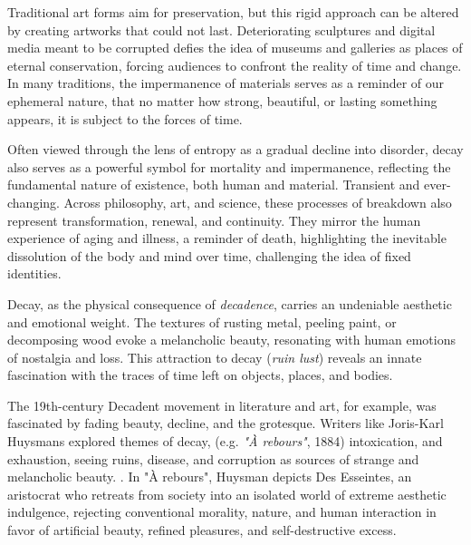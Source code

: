 Traditional art forms aim for preservation, but this rigid approach can be altered by creating artworks that could not last. Deteriorating sculptures and digital media meant to be corrupted defies the idea of museums and galleries as places of eternal conservation, forcing audiences to confront the reality of time and change. In many traditions, the impermanence of materials serves as a reminder of our ephemeral nature, that no matter how strong, beautiful, or lasting something appears, it is subject to the forces of time.

Often viewed through the lens of entropy as a gradual decline into disorder, decay also serves as a powerful symbol for mortality and impermanence, reflecting the fundamental nature of existence, both human and material. Transient and ever-changing. Across philosophy, art, and science, these processes of breakdown also represent transformation, renewal, and continuity. They mirror the human experience of aging and illness, a reminder of death, highlighting the inevitable dissolution of the body and mind over time, challenging the idea of fixed identities. 






Decay, as the physical consequence of \textit{decadence}, carries an undeniable aesthetic and emotional weight. The textures of rusting metal, peeling paint, or decomposing wood evoke a melancholic beauty, resonating with human emotions of nostalgia and loss. This attraction to decay (\textit{ruin lust}) reveals an innate fascination with the traces of time left on objects, places, and bodies.

The 19th-century Decadent movement in literature and art, for example, was fascinated by fading beauty, decline, and the grotesque. Writers like Joris-Karl Huysmans explored themes of decay, (e.g. \textit{"À rebours"}, 1884) intoxication, and exhaustion, seeing ruins, disease, and corruption as sources of strange and melancholic beauty. \citep{huysmans1884}. In "À rebours", Huysman depicts Des Esseintes, an aristocrat who retreats from society into an isolated world of extreme aesthetic indulgence, rejecting conventional morality, nature, and human interaction in favor of artificial beauty, refined pleasures, and self-destructive excess. 


